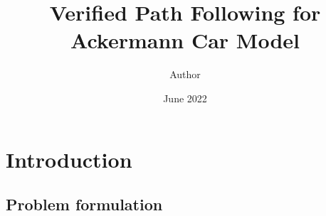 \documentclass{article}
\title{Verified Path Following for Ackermann Car Model}
\author{Author}
\date{June 2022}
\theoremstyle{plain}
\theoremstyle{definition}
\theoremstyle{remark}
\begin{document}
\maketitle

\begin{abstract}
\end{abstract}

\section{Introduction}

\subsection{Problem formulation}
\end{document}
